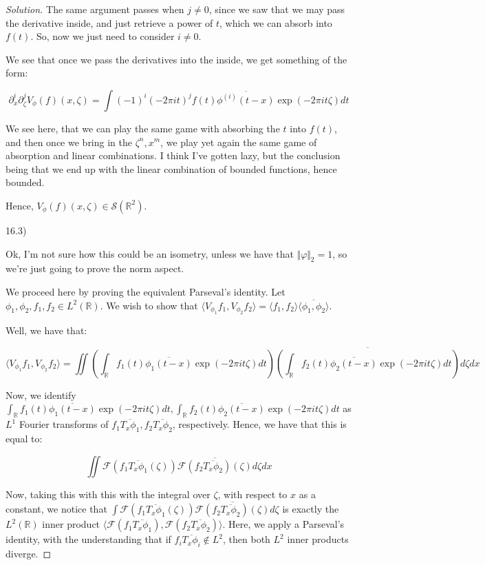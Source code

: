 \documentclass[10pt]{article}
\begin{document}
\begin{proof}[Solution]
The same argument passes when $j \not = 0$, since we saw that we may pass the derivative inside, and just retrieve a power of $t$, which we can absorb into $f(t)$. So, now we just need to consider $i \not = 0$.

We see that once we pass the derivatives into the inside, we get something of the form:

$$  \partial_x^i \partial_\zeta^j V_\phi(f)(x, \zeta)  = \int (-1)^i (-2 \pi i t)^j f(t) \overline{\phi^{(i)}(t - x)} \exp(-2 \pi i t \zeta) dt $$

We see here, that we can play the same game with absorbing the $t$ into $f(t)$, and then once we bring in the $\zeta^n, x^m$, we play yet again the same game of absorption and linear combinations. I think I've gotten lazy, but the conclusion being that we end up with the linear combination of bounded functions, hence bounded.

Hence, $V_\phi(f)(x, \zeta) \in \mathcal{S}(\mathbb{R}^2)$. 

16.3)

Ok, I'm not sure how this could be an isometry, unless we have that $\Vert \varphi \Vert_2 = 1$, so we're just going to prove the norm aspect.

We proceed here by proving the equivalent Parseval's identity. Let $\phi_1, \phi_2, f_1, f_2 \in L^2(\mathbb{R})$. We wish to show that $\langle V_{\phi_1} f_1, V_{\phi_2} f_2 \rangle = \langle f_1, f_2 \rangle \overline{\langle \phi_1, \phi_2 \rangle}$.

Well, we have that:

$$ \langle V_{\phi_1} f_1, V_{\phi_2} f_2 \rangle = \iint  \left( \int_{\mathbb{R}} f_1(t) \overline{\phi_1(t - x)} \exp( -2 \pi i t \zeta) dt \right) \overline{\left( \int_{\mathbb{R}}  f_2(t) \overline{\phi_2(t - x)} \exp(-2 \pi i t \zeta) dt \right)} d\zeta dx $$

Now, we identify $\int_{\mathbb{R}} f_1(t) \overline{\phi_1(t - x)} \exp( -2 \pi i t \zeta) dt, \int_{\mathbb{R}}  f_2(t) \overline{\phi_2(t - x)} \exp(-2 \pi i t \zeta) dt $ as $L^1$ Fourier transforms of $f_1 \overline{T_x \phi_1}, f_2 \overline{T_x \phi_2}$, respectively. Hence, we have that this is equal to:

$$ \iint \mathcal{F}( f_1 \overline{T_x \phi_1}( \zeta)) \overline{\mathcal{F}(f_2 \overline{T_x \phi_2})(\zeta)} d \zeta dx $$

Now, taking this with this with the integral over $\zeta$, with respect to $x$ as a constant, we notice that $ \int   \mathcal{F}( f_1 \overline{T_x \phi_1}( \zeta)) \overline{\mathcal{F}(f_2 \overline{T_x \phi_2})(\zeta)} d \zeta$ is exactly the $L^2(\mathbb{R})$ inner product $\langle \mathcal{F}( f_1 \overline{T_x \phi_1}), \mathcal{F}(f_2 \overline{T_x \phi_2}) \rangle $. Here, we apply a Parseval's identity, with the understanding that if $f_i \overline{T_x \phi_i} \not \in L^2$, then both $L^2$ inner products diverge.


\end{proof}
\end{document}
